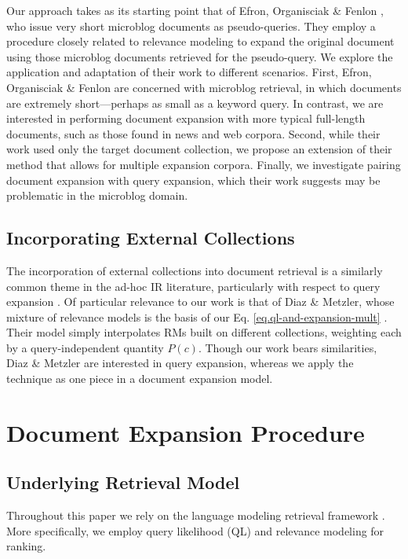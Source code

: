\documentclass{sig-alternate}
\begin{document}
Our approach takes as its starting point that of Efron, Organisciak \& Fenlon \cite{Efron2012}, who issue very short microblog documents as pseudo-queries. They employ a procedure closely related to relevance modeling \cite{Lavrenko2001} to expand the original document using those microblog documents retrieved for the pseudo-query. We explore the application and adaptation of their work to different scenarios. First, Efron, Organisciak \& Fenlon are concerned with microblog retrieval, in which documents are extremely short---perhaps as small as a keyword query. In contrast, we are interested in performing document expansion with more typical full-length documents, such as those found in news and web corpora. Second, while their work used only the target document collection, we propose an extension of their method that allows for multiple expansion corpora. Finally, we investigate pairing document expansion with query expansion, which their work suggests may be problematic in the microblog domain.

\subsection{Incorporating External Collections}\label{section.external.collections}

The incorporation of external collections into document retrieval is a similarly common theme in the ad-hoc IR literature, particularly with respect to query expansion \cite{Bendersky2012, Diaz2006, Li2007, Weerkamp2009, Xu2009}. Of particular relevance to our work is that of Diaz \& Metzler, whose mixture of relevance models is the basis of our Eq. \ref{eq.ql-and-expansion-mult} \cite{Diaz2006}. Their model simply interpolates RMs built on different collections, weighting each by a query-independent quantity $P(c)$. Though our work bears similarities, Diaz \& Metzler are interested in query expansion, whereas we apply the technique as one piece in a document expansion model.

\section{Document Expansion Procedure}\label{section.expanding}

\subsection{Underlying Retrieval Model}\label{section.expanding.model}
Throughout this paper we rely on the language modeling retrieval framework \cite{Lafferty2001}. More specifically, we employ query likelihood (QL) and relevance modeling for ranking.
\end{document}
